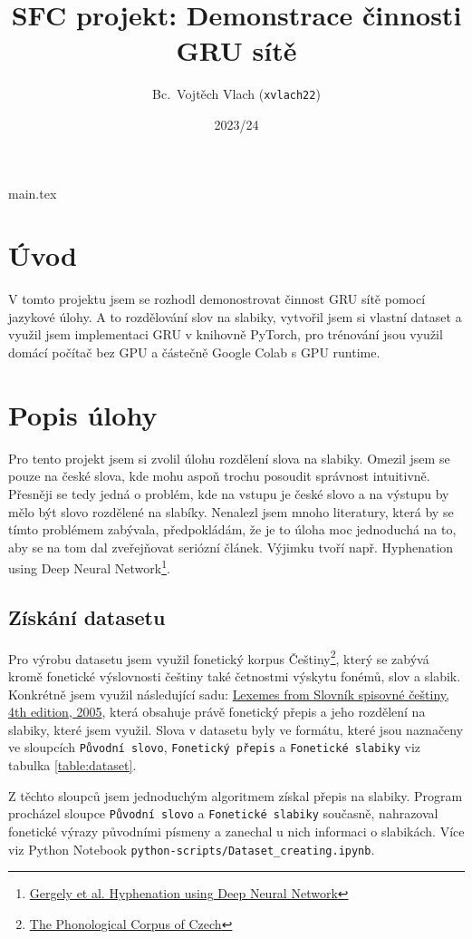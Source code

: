 main.tex\documentclass[a4paper]{article}
\title{SFC projekt: Demonstrace činnosti GRU sítě}
\author{Bc.\ Vojtěch Vlach (\texttt{xvlach22})}
\date{2023/24}
\theoremstyle{definition}
\begin{document}
\maketitle

\section{Úvod}
V tomto projektu jsem se rozhodl demonostrovat činnost GRU sítě pomocí jazykové úlohy. A to rozdělování slov na slabiky, vytvořil jsem si vlastní dataset a využil jsem implementaci GRU v  knihovně PyTorch, pro trénování jsou využil domácí počítač bez GPU a částečně Google Colab s GPU runtime.

\section{Popis úlohy}

Pro tento projekt jsem si zvolil úlohu rozdělení slova na slabiky. Omezil jsem se pouze na české slova, kde mohu aspoň trochu posoudit správnost intuitivně. Přesněji se tedy jedná o problém, kde na vstupu je české slovo a na výstupu by mělo být slovo rozdělené na slabíky. Nenalezl jsem mnoho literatury, která by se tímto problémem zabývala, předpokládám, že je to úloha moc jednoduchá na to, aby se na tom dal zveřejňovat seriózní článek. Výjimku tvoří např. Hyphenation using Deep Neural Network\footnote{\href{https://negedng.github.io/files/2018-Hyphenation.pdf}{Gergely et al. Hyphenation using Deep Neural Network}}.

\subsection{Získání datasetu}

Pro výrobu datasetu jsem využil fonetický korpus Češtiny\footnote{\href{https://ujc.avcr.cz/phword}{The Phonological Corpus of Czech}}, který se zabývá kromě fonetické výslovnosti češtiny také četnostmi výskytu fonémů, slov a slabik. Konkrétně jsem využil následující sadu: \href{http://www.ujc.cas.cz/phword/ssc_29-06-16.zip}{Lexemes from Slovník spisovné češtiny, 4th edition, 2005}, která obsahuje právě fonetický přepis a jeho rozdělení na slabiky, které jsem využil. Slova v datasetu byly ve formátu, které jsou naznačeny ve sloupcích \texttt{Původní slovo}, \texttt{Fonetický přepis} a \texttt{Fonetické slabiky} viz tabulka \ref{table:dataset}.

Z těchto sloupců jsem jednoduchým algoritmem získal přepis na slabiky. Program procházel sloupce \texttt{Původní slovo} a \texttt{Fonetické slabiky} současně, nahrazoval fonetické výrazy původními písmeny a zanechal u nich informaci o slabikách. Více viz Python Notebook \texttt{python-scripts/Dataset\_creating.ipynb}.
\end{document}
